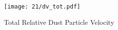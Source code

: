 \vfill

\begin{figure}[h!]
    \begin{center}
        \texttt{[image: 21/dv\_tot.pdf]}
    \end{center}
    \caption{Total Relative Dust Particle Velocity}
    \label{fig:total_relative_dust_particle_velocity}
\end{figure}
